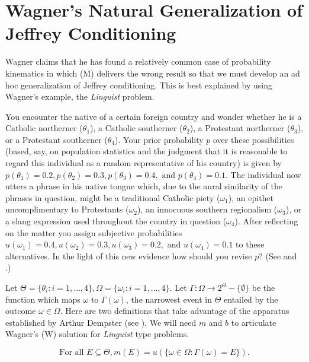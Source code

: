 \documentclass[11pt]{article}
\begin{document}
\section{Wagner's Natural Generalization of Jeffrey Conditioning}
\label{NatGen}

Wagner claims that he has found a relatively common case of
probability kinematics in which (M) delivers the wrong result so that
we must develop an ad hoc generalization of Jeffrey conditioning. This
is best explained by using Wagner's example, the \emph{Linguist}
problem.

\begin{quotex}
  You encounter the native of a certain foreign country and wonder
  whether he is a Catholic northerner ($\theta_{1}$), a Catholic
  southerner ($\theta_{2}$), a Protestant northerner ($\theta_{3}$),
  or a Protestant southerner ($\theta_{4}$). Your prior probability
  $p$ over these possibilities (based, say, on population statistics
  and the judgment that it is reasonable to regard this individual as
  a random representative of his country) is given by
  $p(\theta_{1})=0.2,p(\theta_{2})=0.3,p(\theta_{3})=0.4,\mbox{ and
  }p(\theta_{4})=0.1$. The individual now utters a phrase in his
  native tongue which, due to the aural similarity of the phrases in
  question, might be a traditional Catholic piety ($\omega_{1}$), an
  epithet uncomplimentary to Protestants ($\omega_{2}$), an innocuous
  southern regionalism ($\omega_{3}$), or a slang expression used
  throughout the country in question ($\omega_{4}$). After reflecting
  on the matter you assign subjective probabilities
  $u(\omega_{1})=0.4,u(\omega_{2})=0.3,u(\omega_{3})=0.2,\mbox{ and
  }u(\omega_{4})=0.1$ to these alternatives. In the light of this new
  evidence how should you revise $p$? (See 
  and .)
\end{quotex}

Let
$\Theta=\{\theta_{i}:i=1,\ldots,4\},\Omega=\{\omega_{i}:i=1,\ldots,4\}$.
Let $\Gamma:\Omega\rightarrow{}2^{\Theta}-\{\emptyset\}$ be the
function which maps $\omega$ to $\Gamma(\omega)$, the narrowest event
in $\Theta$ entailed by the outcome $\omega\in\Omega$. Here are two
definitions that take advantage of the apparatus established by Arthur
Dempster (see ). We will need $m$ and $b$ to
articulate Wagner's (W) solution for \emph{Linguist} type problems.

\begin{equation}
  \mbox{For all }E\subseteq{}\Theta, m(E)=u(\{\omega\in\Omega:\Gamma(\omega)=E\})\label{eq:mof}.
\end{equation}
\end{document}
